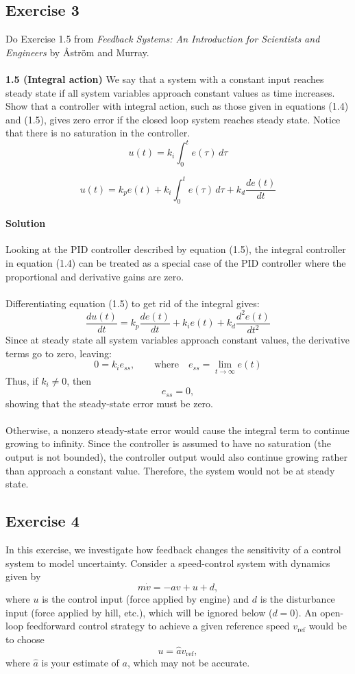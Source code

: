 \documentclass[11pt]{article}
\begin{document}
\subsection*{Exercise 3}
Do Exercise 1.5 from \textit{Feedback Systems: An Introduction for Scientists and Engineers} by \AA str\"om and Murray.\\\\
\textbf{1.5 (Integral action)} We say that a system with a constant input reaches steady state if all system variables approach constant values as time increases. Show that a controller with integral action, such as those given in equations (1.4) and (1.5), gives zero error if the closed loop system reaches steady state. Notice that there is no saturation in the controller.
\begin{equation}
u(t) = k_i \int_0^t e(\tau)\,d\tau
\tag{1.4}
\end{equation}

\begin{equation}
u(t) = k_p e(t)
+ k_i \int_0^t e(\tau)\,d\tau
+ k_d \frac{de(t)}{dt}
\tag{1.5}
\end{equation}

\paragraph{Solution} Looking at the PID controller described by equation (1.5), the integral controller in equation (1.4) can be treated as a special case of the PID controller where the proportional and derivative gains are zero.\\\\
Differentiating equation (1.5) to get rid of the integral gives:
\[
\frac{du(t)}{dt}
=
k_p\frac{de(t)}{dt}
+
k_i e(t)
+
k_d\frac{d^2e(t)}{dt^2}
\]
Since at steady state all system variables approach constant values, the derivative terms go to zero, leaving:
\[
0 = k_i e_{ss},
\qquad
\text{where} \quad e_{ss} = \lim_{t\to\infty} e(t)
\]
Thus, if \(k_i \neq 0\), then
\[
e_{ss}=0,
\]
showing that the steady-state error must be zero.\\\\
Otherwise, a nonzero steady-state error would cause the integral term to continue growing to infinity. Since the controller is assumed to have no saturation (the output is not bounded), the controller output would also continue growing rather than approach a constant value. Therefore, the system would not be at steady state.

\subsection*{Exercise 4}
In this exercise, we investigate how feedback changes the sensitivity of a control system to model uncertainty. Consider a speed-control system with dynamics given by
\[
m\dot{v}=-av+u+d,
\]
where $u$ is the control input (force applied by engine) and $d$ is the disturbance input (force applied by hill, etc.), which will be ignored below ($d=0$). An open-loop feedforward control strategy to achieve a given reference speed $v_{\mathrm{ref}}$ would be to choose
\[
u=\hat{a}v_{\mathrm{ref}},
\]
where $\hat{a}$ is your estimate of $a$, which may not be accurate.
\end{document}
